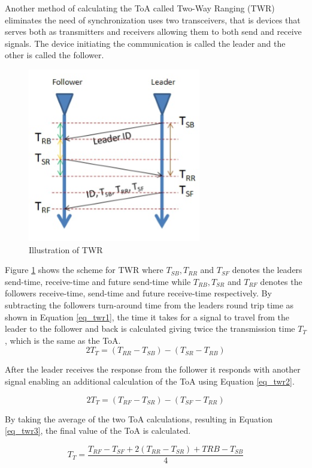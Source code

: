 Another method of calculating the ToA called Two-Way Ranging (TWR) eliminates the need of synchronization uses two transceivers, that is devices that serves both as transmitters and receivers allowing them to both send and receive signals. The device initiating the communication is called the leader and the other is called the follower.
\begin{figure}[H] 
  \centering
      \includegraphics[height=0.5\textwidth]{img/TWR}
  \caption{Illustration of TWR}
  \label{fig_twr}
\end{figure}
Figure \ref{fig_twr} shows the scheme for TWR where $T_{SB},T_{RR}$ and $T_{SF}$ denotes the leaders send-time, receive-time and future send-time while $T_{RB},T_{SR}$ and $T_{RF}$ denotes the followers receive-time, send-time and future receive-time respectively. By subtracting the followers turn-around time from the leaders round trip time as shown in Equation \ref{eq_twr1}, the time it takes for a signal to travel from the leader to the follower and back is calculated giving twice the transmission time $T_T$, which is the same as the ToA. 
\begin{equation} \label{eq_twr1}
2T_{T} = (T_{RR} - T_{SB}) - (T_{SR} - T_{RB})
\end{equation}

After the leader receives the response from the follower it responds with another signal enabling an additional calculation of the ToA using Equation \ref{eq_twr2}.

\begin{equation} \label{eq_twr2}
2T_{T} = (T_{RF} - T_{SR}) - (T_{SF} - T_{RR})
\end{equation}

By taking the average of the two ToA calculations, resulting in Equation \ref{eq_twr3}, the final value of the ToA is calculated.

\begin{equation} \label{eq_twr3}
T_{T} = \frac{T_{RF} - T_{SF} + 2(T_{RR} - T_{SR}) + T{RB} - T_{SB}}{4}
\end{equation}
\clearpage